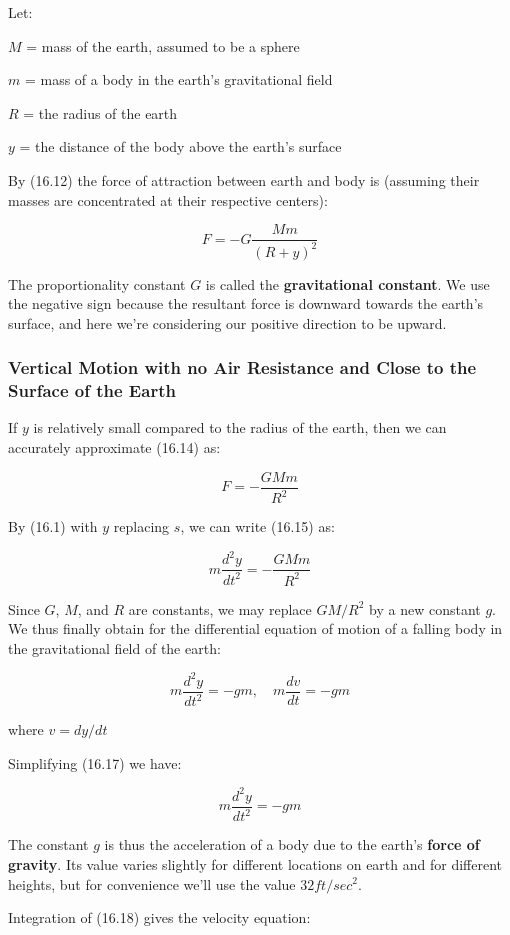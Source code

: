\documentclass{article}
\begin{document}
Let:

$M$ = mass of the earth, assumed to be a sphere

$m$ = mass of a body in the earth's gravitational field

$R$ = the radius of the earth

$y$ = the distance of the body above the earth's surface

By (16.12) the force of attraction between earth and body is (assuming their masses are concentrated at their respective centers):

\[ \tag{16.14} F = -G \frac{Mm}{(R+y)^2} \]

The proportionality constant $G$ is called the \textbf{gravitational constant}. We use the negative sign because the resultant force is downward towards the earth's surface, and here we're considering our positive direction to be upward.

\subsubsection{Vertical Motion with no Air Resistance and Close to the Surface of the Earth}

If $y$ is relatively small compared to the radius of the earth, then we can accurately approximate (16.14) as:

\[ \tag{16.15} F = -\frac{GMm}{R^2} \]

By (16.1) with $y$ replacing $s$, we can write (16.15) as:

\[ \tag{16.16} m\frac{d^2y}{dt^2} = - \frac{GMm}{R^2} \]

Since $G$, $M$, and $R$ are constants, we may replace $GM/R^2$ by a new constant $g$. We thus finally obtain for the differential equation of motion of a falling body in the gravitational field of the earth:

\[ \tag{16.17} m\frac{d^2y}{dt^2} = -gm,\quad m\frac{dv}{dt} = -gm \]

where $v = dy/dt$

Simplifying (16.17) we have:

\[ \tag{16.18} m\frac{d^2y}{dt^2} = -gm \]

The constant $g$ is thus the acceleration of a body due to the earth's \textbf{force of gravity}. Its value varies slightly for different locations on earth and for different heights, but for convenience we'll use the value $32 ft/sec^2$.

Integration of (16.18) gives the velocity equation:
\end{document}
